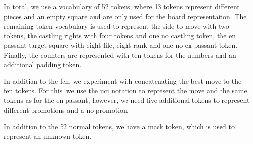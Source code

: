 In total, we use a vocabulary of 52 tokens, where 13 tokens represent different pieces and an empty square and are only used for the board representation. The remaining token vocabulary is used to represent the side to move with two tokens, the castling rights with four tokens and one no castling token, the en passant target square with eight file, eight rank and one no en passant token. Finally, the counters are represented with ten tokens for the numbers and an additional padding token.

In addition to the fen, we experiment with concatenating the best move to the fen tokens. For this, we use the uci notation to represent the move and the same tokens as for the en passant, however, we need five additional tokens to represent different promotions and a no promotion. 

In addition to the 52 normal tokens, we have a mask token, which is used to represent an unknown token.
